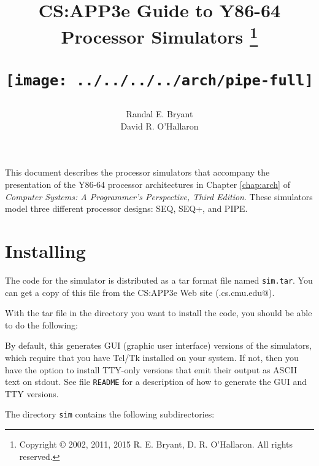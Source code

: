 \documentclass[11pt]{article}
\begin{document}


\title{CS:APP3e Guide to Y86-64 Processor Simulators%
\thanks{Copyright \copyright{} 2002, 2011, 2015 R. E. Bryant, D. R.
O'Hallaron.  All rights reserved.}\\
\vspace*{0.75in}
\centerline{\texttt{[image: ../../../../arch/pipe-full]}}
}

\author{Randal E. Bryant\\ David R. O'Hallaron}

\maketitle

%

This document describes the processor simulators that accompany the
presentation of the Y86-64 processor architectures in Chapter
\ref{chap:arch} of {\em Computer Systems: A Programmer's Perspective,
  Third Edition}.  
These simulators model three different processor designs: SEQ, SEQ+,
and PIPE\@.

\section{Installing}

The code for the simulator is distributed as a tar format file named
 \texttt{sim.tar}.  You can get a copy of this file from the CS:APP3e
 Web site (\verb@csapp.cs.cmu.edu@).


With the tar file in the directory you want to install the code, you
should be able to do the following:
\begin{tty}
\end{tty}

By default, this generates GUI (graphic user interface) versions of
the simulators, which require that you have Tcl/Tk installed on your
system. If not, then you have the option to install TTY-only
versions that emit their output as ASCII text on
stdout. See file {\tt README} for a description of
how to generate the GUI and TTY versions.

The directory \texttt{sim} contains the following subdirectories:
\end{document}
